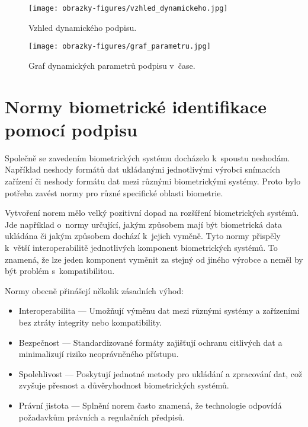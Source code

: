 \begin{figure}[H]
  \centering
  \begin{minipage}{0.45\textwidth}
      \centering
      \texttt{[image: obrazky-figures/vzhled\_dynamickeho.jpg]}
      \caption{Vzhled dynamického podpisu.~\cite{RakRoman2008}}
      \label{fig:vzhled_dynamickeho_podpisu}
  \end{minipage}\hfill
  \begin{minipage}{0.45\textwidth}
      \centering
      \texttt{[image: obrazky-figures/graf\_parametru.jpg]}
      \caption{Graf dynamických parametrů podpisu v~čase.~\cite{RakRoman2008}}
      \label{fig:graf_dynamickych_parametru}
  \end{minipage}
\end{figure}

\section{Normy biometrické identifikace pomocí podpisu}
Společně se zavedením biometrických systému docházelo k~spoustu neshodám.
Například neshody formátů dat ukládanými jednotlivými výrobci snímacích zařízení či neshody formátu dat mezi různými biometrickými systémy.
Proto bylo potřeba zavést normy pro různé specifické oblasti biometrie.

Vytvoření norem mělo velký pozitivní dopad na rozšíření biometrických systémů.                                               %
Jde například o~normy určující, jakým způsobem mají být biometrická data ukládána či jakým způsobem dochází k~jejich vyměně. %
Tyto normy přispěly k~větší interoperabilitě jednotlivých komponent biometrických systémů.                                   %
To znamená, že lze jeden komponent vyměnit za stejný od jiného výrobce a neměl by být problém s~kompatibilitou.~\cite{DrahanskýMartin2011}%
\newline 

\noindent
Normy obecně přinášejí několik zásadních výhod:
\begin{itemize}
  \item Interoperabilita --- Umožňují výměnu dat mezi různými systémy a zařízeními bez ztráty integrity nebo kompatibility.
  \item Bezpečnost --- Standardizované formáty zajišťují ochranu citlivých dat a minimalizují riziko neoprávněného přístupu.
  \item Spolehlivost --- Poskytují jednotné metody pro ukládání a zpracování dat, což zvyšuje přesnost a důvěryhodnost biometrických systémů.
  \item Právní jistota --- Splnění norem často znamená, že technologie odpovídá požadavkům právních a regulačních předpisů.
\end{itemize}

